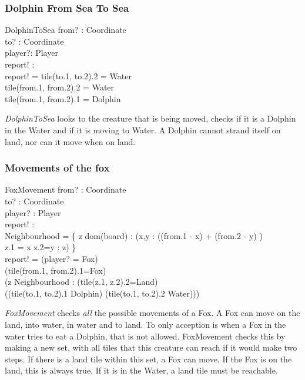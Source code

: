 \documentclass[a4paper,twoside,11pt]{book}
\begin{document}

\subsubsection{Dolphin From Sea To Sea} %
\label{ssub:dolphin_from_sea_to_sea}
\begin{schema}{DolphinToSea}
    from? : Coordinate \\
    to? : Coordinate \\
    player?: Player \\
    report! :  \\
    \ST
    report! = tile(to.1, to.2).2 = Water \\
    \wedge tile(from.1, from.2).2 = Water \\
    \wedge tile(from.1, from.2).1 = Dolphin\\
\end{schema}
\emph{DolphinToSea} looks to the creature that is being moved, checks if it is a Dolphin in the Water and if it is moving to Water. A Dolphin cannot strand itself on land, nor can it move when on land.

\subsubsection{Movements of the fox} %
\label{ssub:movements_of_the_fox}

\begin{schema}{FoxMovement}
    from? : Coordinate \\
    to? : Coordinate \\
    player? : Player \\
    report! :  \\
    \ST
    Neighbourhood = \{ z \in dom(board) :  (x,y \in {} : ((from.1 - x) + (from.2 - y) ) \wedge \\ z.1 = x \wedge z.2=y : z) \} \\
      report! = (player? = Fox) \wedge \\
      (tile(from.1, from.2).1=Fox) \wedge \\
       (z \in Neighbourhood : (tile(z.1, z.2).2=Land) \wedge \\
      ((tile(to.1, to.2).1 \neq Dolphin) \vee (tile(to.1, to.2).2 \neq Water))) \\
\end{schema}
\emph{FoxMovement} checks \emph{all} the possible movements of a Fox. A Fox can move on the land, into water, in water and to land. To only acception is when a Fox in the water tries to eat a Dolphin, that is not allowed. FoxMovement checks this by making a new set, with all tiles that this creature can reach if it would make two steps. If there is a land tile within this set, a Fox can move. If the Fox is on the land, this is always true. If it is in the Water, a land tile must be reachable. \\
\end{document}
